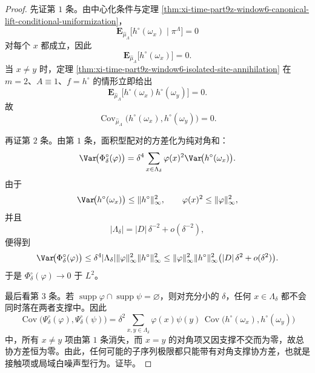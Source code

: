 \begin{proof}
先证第 \(1\) 条。由中心化条件与定理
\ref{thm:xi-time-part9z-window6-canonical-lift-conditional-uniformization}，
\[
\mathbf E_{\widehat\mu_\Lambda}\!\bigl[h^\circ(\omega_x)\mid \pi^\Lambda\bigr]=0
\]
对每个 \(x\) 都成立，因此
\[
\mathbf E_{\widehat\mu_\Lambda}\!\bigl[h^\circ(\omega_x)\bigr]=0.
\]
当 \(x\neq y\) 时，定理
\ref{thm:xi-time-part9z-window6-isolated-site-annihilation} 在 \(m=2\)、\(A\equiv 1\)、\(f=h^\circ\) 的情形立即给出
\[
\mathbf E_{\widehat\mu_\Lambda}\!\bigl[h^\circ(\omega_x)h^\circ(\omega_y)\bigr]=0.
\]
故
\[
\operatorname{Cov}_{\widehat\mu_\Lambda}\!\bigl(h^\circ(\omega_x),h^\circ(\omega_y)\bigr)=0.
\]

再证第 \(2\) 条。由第 \(1\) 条，面积型配对的方差化为纯对角和：
\[
\Var\!\bigl(\Phi_\delta^\circ(\varphi)\bigr)
=
\delta^4\sum_{x\in\Lambda_\delta}\varphi(x)^2
\Var\!\bigl(h^\circ(\omega_x)\bigr).
\]
由于
\[
\Var\!\bigl(h^\circ(\omega_x)\bigr)\le \|h^\circ\|_\infty^2,
\qquad
\varphi(x)^2\le \|\varphi\|_\infty^2,
\]
并且
\[
|\Lambda_\delta|=|D|\,\delta^{-2}+o(\delta^{-2}),
\]
便得到
\[
\Var\!\bigl(\Phi_\delta^\circ(\varphi)\bigr)
\le
\delta^4|\Lambda_\delta|\|\varphi\|_\infty^2\|h^\circ\|_\infty^2
\le
\|\varphi\|_\infty^2\|h^\circ\|_\infty^2
\bigl(|D|\,\delta^2+o(\delta^2)\bigr).
\]
于是 \(\Phi_\delta^\circ(\varphi)\to 0\) 于 \(L^2\)。

最后看第 \(3\) 条。若 \(\operatorname{supp}\varphi\cap \operatorname{supp}\psi=\varnothing\)，则对充分小的 \(\delta\)，任何 \(x\in\Lambda_\delta\) 都不会同时落在两者支撑中。因此
\[
\operatorname{Cov}\!\bigl(\Psi_\delta^\circ(\varphi),\Psi_\delta^\circ(\psi)\bigr)
=
\delta^2\sum_{x,y\in\Lambda_\delta}
\varphi(x)\psi(y)\,
\operatorname{Cov}\!\bigl(h^\circ(\omega_x),h^\circ(\omega_y)\bigr)
\]
中，所有 \(x\neq y\) 项由第 \(1\) 条消失，而 \(x=y\) 的对角项又因支撑不交而为零，故总协方差恒为零。由此，任何可能的子序列极限都只能带有对角支撑协方差，也就是接触项或局域白噪声型行为。证毕。
\end{proof}

\endinput
